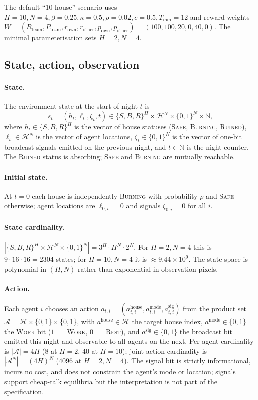 \documentclass{anvil-paper}
\begin{document}
The default ``10-house'' scenario uses $H{=}10,N{=}4,\beta{=}0.25,
\kappa{=}0.5,\rho{=}0.02,c{=}0.5,T_{\min}{=}12$ and reward weights
$W=(R_{\text{team}},P_{\text{team}},r_{\text{own}},r_{\text{other}},
p_{\text{own}},p_{\text{other}})=(100,100,20,0,40,0)$. The minimal
parameterisation sets $H{=}2,N{=}4$.

\subsection{State, action, observation}
\label{app:envspec:soa}

\paragraph{State.} The environment state at the start of night $t$ is
\[
  s_t = (h_t,\ell_t,\zeta_t,t)\in\{S,B,R\}^H\times
        \mathcal{H}^N\times\{0,1\}^N\times\mathbb{N},
\]
where $h_t\in\{S,B,R\}^H$ is the vector of house statuses (\textsc{Safe},
\textsc{Burning}, \textsc{Ruined}), $\ell_t\in\mathcal{H}^N$ is the
vector of agent locations, $\zeta_t\in\{0,1\}^N$ is the vector of one-bit
broadcast signals emitted on the previous night, and $t\in\mathbb{N}$ is
the night counter. The \textsc{Ruined} status is absorbing; \textsc{Safe}
and \textsc{Burning} are mutually reachable.

\paragraph{Initial state.} At $t{=}0$ each house is independently
\textsc{Burning} with probability $\rho$ and \textsc{Safe} otherwise;
agent locations are $\ell_{0,i}{=}0$ and signals $\zeta_{0,i}{=}0$ for
all $i$.

\paragraph{State cardinality.}
$|\{S,B,R\}^H\times\mathcal{H}^N\times\{0,1\}^N|=3^H\cdot H^N\cdot 2^N$.
For $H{=}2,N{=}4$ this is $9\cdot 16\cdot 16=2304$ states; for
$H{=}10,N{=}4$ it is $\approx 9.44\times 10^{9}$. The state space is
polynomial in $(H,N)$ rather than exponential in observation pixels.

\paragraph{Action.} Each agent $i$ chooses an action $a_{t,i}=
(a_{t,i}^{\text{house}},a_{t,i}^{\text{mode}},a_{t,i}^{\text{sig}})$
from the product set $\mathcal{A}=\mathcal{H}\times\{0,1\}\times\{0,1\}$,
with $a^{\text{house}}\in\mathcal{H}$ the target house index,
$a^{\text{mode}}\in\{0,1\}$ the \textsc{Work} bit ($1$~=~\textsc{Work},
$0$~=~\textsc{Rest}), and $a^{\text{sig}}\in\{0,1\}$ the broadcast bit
emitted this night and observable to all agents on the next. Per-agent
cardinality is $|\mathcal{A}|=4H$ ($8$ at $H{=}2$, $40$ at $H{=}10$);
joint-action cardinality is $|\mathcal{A}^N|=(4H)^N$ ($4096$ at
$H{=}2,N{=}4$). The signal bit is strictly informational, incurs no
cost, and does not constrain the agent's mode or location; signals
support cheap-talk equilibria but the interpretation is not part of the
specification.
\end{document}
